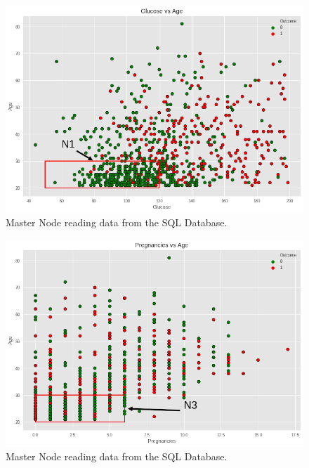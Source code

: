 \documentclass[12pt]{article}
\begin{document}
\clearpage


\begin{figure}[ht]
\centering
\includegraphics[width=1\textwidth]{download(1).png}
\caption{Master Node reading data from the SQL Database.}
\end{figure}

\begin{figure}[ht]
\centering
\includegraphics[width=1\textwidth]{download(2).png}
\caption{Master Node reading data from the SQL Database.}
\end{figure}
\end{document}

